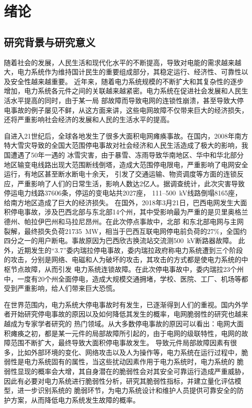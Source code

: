 \chapter{绪论}

\section{研究背景与研究意义}
\label{sec:research_background}
随着社会的发展，人民生活和现代化水平的不断提高，导致对电能的需求越来越大，电力系统作为维持国计民生的重要组成部分，其稳定运行、经济性、可靠性以及安全性越来越重要。
近年来，随着电力系统规模的不断扩大和其复杂性的逐步增加，电力系统各元件之间的关联越来越紧密。电力系统在促进社会发展和人民生活水平提高的同时，由于某一局
部故障而导致电网的连锁性崩溃，甚至导致大停电事故的例子屡见不鲜，从这方面来讲，这些电网故障不仅带来巨大的经济损失，还将严重影响社会经济的发展和人民的生活水平的提高。

自进入21世纪后，全球各地发生了很多大面积电网瘫痪事故。在国内，2008年南方特大雪灾导致的全国大范围停电事故对社会经济和人民生活造成了极大的影响，我国遭遇了50年一遇的
冰雪灾害，由于暴雪、冻雨导致华南地区、华中和华北部分地区输变电线路出现大范围断线倒塔，造成大范围停电限电，严重影响了电网安全运行，有地区甚至断水断电十余天，
引发了交通运输、物资调度等方面的连锁反应，严重影响了人们的日常生活，影响人数达2亿人。据调查统计，此次灾害导致停运电力线路37606条，停运的变电站共2027座，
111--500~kV线路倒塌8165座，给南方地区造成了巨大的经济损失。
在国外，2018年3月21日，巴西电网发生大面积停电事故，涉及巴西北部与东北部14个州，其中受影响最为严重的是贝里奥格兰德州、帕拉伊巴州和马拉尼昂州。在此次停点事故中，北部
和东北部电网与主网裂解，最终损失负荷21735~MW，相当于巴西互联电网停电前负荷的27\%，全国约四分之一的用户断电。事故原因为巴西欣古换流站交流测500~kV断路器故障\cite{refs1}。
此外，近期发生的“3.7”委内瑞拉停电事故，委内瑞拉政府称电力系统遭到三个阶段的攻击，分别是网络、电磁和人为破坏的攻击，其攻击的方式都是使电力系统的中枢节点故障，从而引发
电力系统连锁故障。在此次停电事故中，委内瑞拉23个州中，一度有20个州全面停电，造成大规模交通拥堵，学校、医院、工厂、机场等都受到严重影响，给人们带来巨大恐慌。

在世界范围内，电力系统大停电事故时有发生，已逐渐得到人们的重视。国内外学者开始研究停电事故的原因以及如何降低其发生的概率，电网脆弱性的研究也越来越成为专家学者研究的
热门领域。从大多数停电事故的原因可以看出：电网大面积瘫痪之初，都是某一元件的局部故障所引起的，由于电网的级联特性，电网的故障范围不断扩大，最终导致大面积停电事故发生。
导致元件局部故障因素有很多，比如外部环境的变化、网络攻击以及人为操作等，电力系统在运行过程中，脆弱性是电力系统固有的属性，当这些扰动因素作用于电力系统时，电力系统的
脆弱性显现的概率会大增，其自身潜在的脆弱性会对其安全可靠运行造成严重威胁，因此有必要对电力系统进行脆弱性分析，研究其脆弱性指标，并建立量化评估模型，进一步识别系统的
脆弱环节，为电力系统设计和维护人员提供可靠安全的防护方案，从而降低电力系统发生故障的概率。
